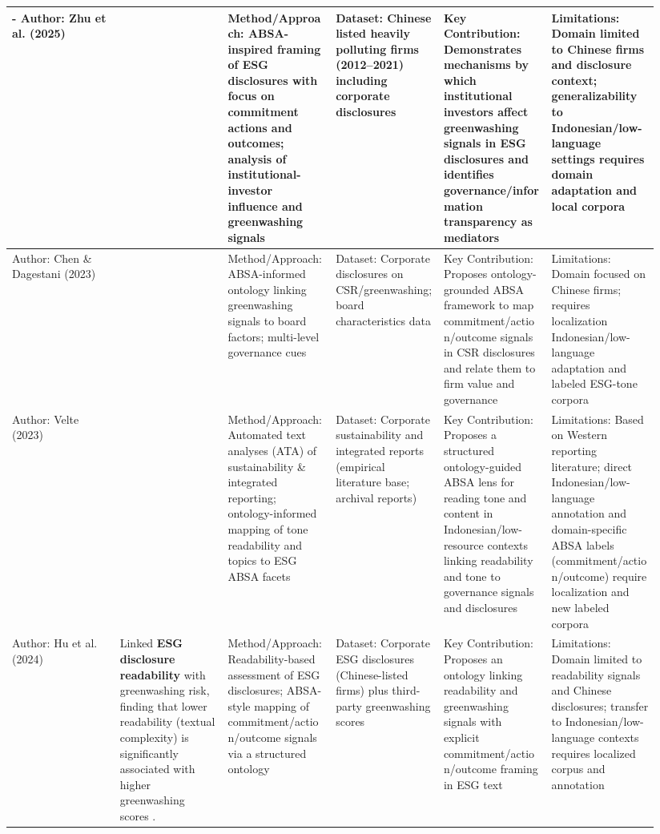 \documentclass{article}
\begin{document}
\begin{landscape}
\begin{longtable}{p{0.157\linewidth} p{0.157\linewidth} p{0.157\linewidth} p{0.157\linewidth} p{0.157\linewidth} p{0.157\linewidth}}
- Author: Zhu et al. (2025) & ~ & Method/Approach: ABSA-inspired framing of ESG disclosures with focus on commitment actions and outcomes; analysis of institutional-investor influence and greenwashing signals & Dataset: Chinese listed heavily polluting firms (2012–2021) including corporate disclosures & Key Contribution: Demonstrates mechanisms by which institutional investors affect greenwashing signals in ESG disclosures and identifies governance/information transparency as mediators & Limitations: Domain limited to Chinese firms and disclosure context; generalizability to Indonesian/low-language settings requires domain adaptation and local corpora \\ \hline
Author: Chen \& Dagestani (2023) & ~ & Method/Approach: ABSA-informed ontology linking greenwashing signals to board factors; multi-level governance cues & Dataset: Corporate disclosures on CSR/greenwashing; board characteristics data & Key Contribution: Proposes ontology-grounded ABSA framework to map commitment/action/outcome signals in CSR disclosures and relate them to firm value and governance & Limitations: Domain focused on Chinese firms; requires localization Indonesian/low-language adaptation and labeled ESG-tone corpora \\ \hline
Author: Velte (2023) & ~ & Method/Approach: Automated text analyses (ATA) of sustainability \& integrated reporting; ontology-informed mapping of tone readability and topics to ESG ABSA facets & Dataset: Corporate sustainability and integrated reports (empirical literature base; archival reports) & Key Contribution: Proposes a structured ontology-guided ABSA lens for reading tone and content in Indonesian/low-resource contexts linking readability and tone to governance signals and disclosures & Limitations: Based on Western reporting literature; direct Indonesian/low-language annotation and domain-specific ABSA labels (commitment/action/outcome) require localization and new labeled corpora \\ \hline
Author: Hu et al. (2024) & Linked \textbf{ESG disclosure readability} with greenwashing risk, finding that lower readability (textual complexity) is significantly associated with higher greenwashing scores  \parencite{peng_hu_70ddb6b1}. & Method/Approach: Readability-based assessment of ESG disclosures; ABSA-style mapping of commitment/action/outcome signals via a structured ontology & Dataset: Corporate ESG disclosures (Chinese-listed firms) plus third-party greenwashing scores & Key Contribution: Proposes an ontology linking readability and greenwashing signals with explicit commitment/action/outcome framing in ESG text & Limitations: Domain limited to readability signals and Chinese disclosures; transfer to Indonesian/low-language contexts requires localized corpus and annotation \\ \hline

\end{longtable}
\end{landscape}
\end{document}
